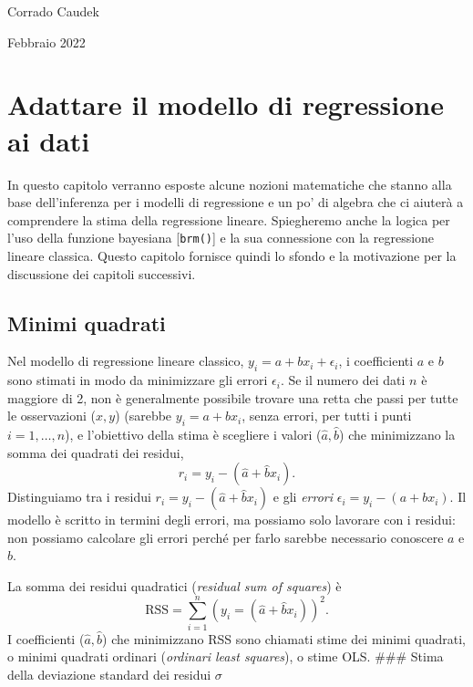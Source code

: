 \documentclass[
  10pt,
  italian,
  a4paper,
  extrafontsizes,onecolumn,openright
  ]{memoir}
\begin{document}
\bigskip

Corrado Caudek

\bigskip

Febbraio 2022

\mainmatter

\hypertarget{regr-ml}{%
\chapter{Adattare il modello di regressione ai dati}\label{regr-ml}}

In questo capitolo verranno esposte alcune nozioni matematiche che stanno alla base dell'inferenza per i modelli di regressione e un po' di algebra che ci aiuterà a comprendere la stima della regressione lineare. Spiegheremo anche la logica per l'uso della funzione bayesiana {[}\texttt{brm()}{]} e la sua connessione con la regressione lineare classica. Questo capitolo fornisce quindi lo sfondo e la motivazione per la discussione dei capitoli successivi.

\hypertarget{minimi-quadrati}{%
\section{Minimi quadrati}\label{minimi-quadrati}}

Nel modello di regressione lineare classico, \(y_i = a + b x_i + \epsilon_i\), i coefficienti \(a\) e \(b\) sono stimati in modo da minimizzare gli errori \(\epsilon_i\). Se il numero dei dati \(n\) è maggiore di 2, non è generalmente possibile trovare una retta che passi per tutte le osservazioni (\(x, y\)) (sarebbe \(y_i = a + b x_i\), senza errori, per tutti i punti \(i = 1, \dots, n\)), e l'obiettivo della stima è scegliere i valori (\(\hat{a}, \hat{b}\)) che minimizzano la somma dei quadrati dei residui,
\[
r_i = y_i − (\hat{a} + \hat{b} x_i).
\]
Distinguiamo tra i residui \(r_i = y_i - (\hat{a} + \hat{b} x_i)\) e gli \emph{errori} \(\epsilon_i = y_i − (a + b x_i)\). Il modello è scritto in termini degli errori, ma possiamo solo lavorare con i residui: non possiamo calcolare gli errori perché per farlo sarebbe necessario conoscere \(a\) e \(b\).

La somma dei residui quadratici (\emph{residual sum of squares}) è
\[
\text{RSS} = \sum_{i=1}^n (y_i = (\hat{a} + \hat{b} x_i))^2.
\]
I coefficienti (\(\hat{a}, \hat{b}\)) che minimizzano RSS sono chiamati stime dei minimi quadrati, o minimi quadrati ordinari (\emph{ordinari least squares}), o stime OLS.
\#\#\# Stima della deviazione standard dei residui \(\sigma\)
\end{document}
